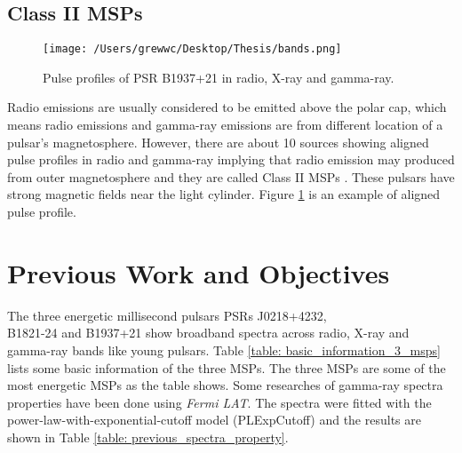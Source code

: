 \documentclass[12pt]{report}
\begin{document}
        \subsection{Class II MSPs}
          \begin{figure}[h]   
            \centering
            \texttt{[image: /Users/grewwc/Desktop/Thesis/bands.png]}
            \caption{Pulse profiles of PSR B1937+21 in radio, X-ray and gamma-ray.
              \protect \cite{0004-637X-787-2-167}}
            \label{fig:class }
          \end{figure}	 
          Radio emissions are usually considered to be emitted above the polar cap, which means
          radio emissions and gamma-ray emissions are from different location of a pulsar's 
          magnetosphere. However, there are about 10 sources showing aligned pulse profiles in 
          radio and gamma-ray implying that radio emission may produced from outer 
          magnetosphere and they are called Class II MSPs \cite{0004-637X-744-1-33}.
          These pulsars have strong magnetic fields near the light cylinder. 
          Figure \ref{fig:class } is an example of aligned pulse profile.

      \section{Previous Work and Objectives}
        The three energetic millisecond pulsars PSRs J0218+4232, \\ 
        B1821-24 and B1937+21 show 
        broadband spectra across radio, X-ray and gamma-ray bands like young pulsars. Table 
        \ref{table: basic_information_3_msps} lists some basic information of the three MSPs. 
        The three MSPs are some of the most energetic MSPs as the table shows. Some researches
        of gamma-ray spectra properties have been done using \textit{Fermi LAT}. The spectra were 
        fitted with the power-law-with-exponential-cutoff model (PLExpCutoff) and the results 
        are shown in Table \ref{table: previous_spectra_property}. 
\end{document}
